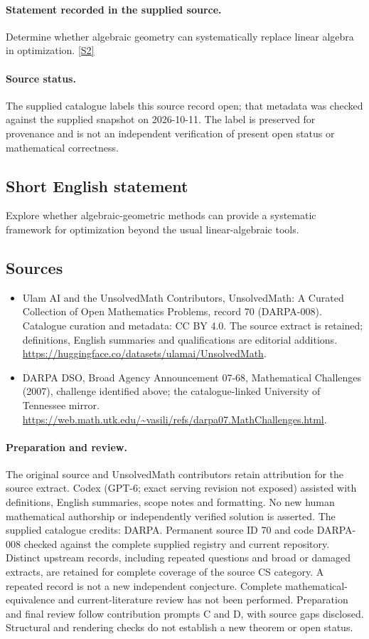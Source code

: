 \documentclass[11pt]{article}
\begin{document}
\paragraph{Statement recorded in the supplied source.}
Determine whether algebraic geometry can systematically replace linear algebra in optimization. \href{https://web.math.utk.edu/~vasili/refs/darpa07.MathChallenges.html}{[S2]}
\paragraph{Source status.}
The supplied catalogue labels this source record open; that metadata was checked against the supplied snapshot on 2026-10-11. The label is preserved for provenance and is not an independent verification of present open status or mathematical correctness.
\subsection{Short English statement}
Explore whether algebraic-geometric methods can provide a systematic framework for optimization beyond the usual linear-algebraic tools.
\subsection{Sources}
\begin{itemize}
\item[S1] Ulam AI and the UnsolvedMath Contributors, UnsolvedMath: A Curated Collection of Open Mathematics Problems, record 70 (DARPA-008). Catalogue curation and metadata: CC BY 4.0. The source extract is retained; definitions, English summaries and qualifications are editorial additions.
\url{https://huggingface.co/datasets/ulamai/UnsolvedMath}.
\item[S2] DARPA DSO, Broad Agency Announcement 07-68, Mathematical Challenges (2007), challenge identified above; the catalogue-linked University of Tennessee mirror.
\url{https://web.math.utk.edu/~vasili/refs/darpa07.MathChallenges.html}.
\end{itemize}
\paragraph{Preparation and review.}
The original source and UnsolvedMath contributors retain attribution for the source extract. Codex (GPT-6; exact serving revision not exposed) assisted with definitions, English summaries, scope notes and formatting. No new human mathematical authorship or independently verified solution is asserted. The supplied catalogue credits: DARPA. Permanent source ID 70 and code DARPA-008 checked against the complete supplied registry and current repository. Distinct upstream records, including repeated questions and broad or damaged extracts, are retained for complete coverage of the source CS category. A repeated record is not a new independent conjecture. Complete mathematical-equivalence and current-literature review has not been performed. Preparation and final review follow contribution prompts C and D, with source gaps disclosed. Structural and rendering checks do not establish a new theorem or open status.
\label{end:70}
\end{document}
